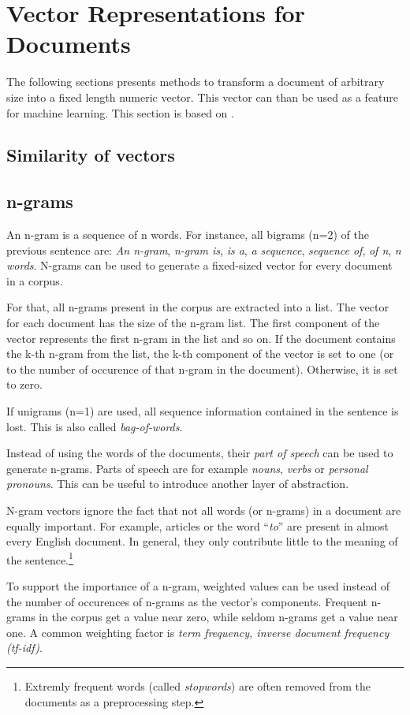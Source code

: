 \section{Vector Representations for Documents}
The following sections presents methods to transform a document of arbitrary size into a fixed length numeric vector. This vector can than be used as a feature for machine learning. This section is based on \cite{martin2009speech}.

\subsection{Similarity of vectors}

\subsection{n-grams}
An n-gram is a sequence of n words. For instance, all bigrams (n=2) of the previous sentence are: \emph{An n-gram}, \emph{n-gram is}, \emph{is a}, \emph{a sequence}, \emph{sequence of}, \emph{of n}, \emph{n words}. N-grams can be used to generate a fixed-sized vector for every document in a corpus.

For that, all n-grams present in the corpus are extracted into a list. The vector for each document has the size of the n-gram list. The first component of the vector represents the first n-gram in the list and so on. If the document contains the k-th n-gram from the list, the k-th component of the vector is set to one (or to the number of occurence of that n-gram in the document). Otherwise, it is set to zero.

If unigrams (n=1) are used, all sequence information contained in the sentence is lost. This is also called \emph{bag-of-words}.

Instead of using the words of the documents, their \emph{part of speech} can be used to generate n-grams. Parts of speech are for example \emph{nouns}, \emph{verbs} or \emph{personal pronouns}. This can be useful to introduce another layer of abstraction.

N-gram vectors ignore the fact that not all words (or n-grams) in a document are equally important. For example, articles or the word \enquote{\emph{to}} are present in almost every English document. In general, they only contribute little to the meaning of the sentence.\footnote{Extremly frequent words (called \emph{stopwords}) are often removed from the documents as a preprocessing step.}

To support the importance of a n-gram, weighted values can be used instead of the number of occurences of n-grams as the vector's components. Frequent n-grams in the corpus get a value near zero, while seldom n-grams get a value near one. A common weighting factor is \emph{term frequency, inverse document frequency (tf-idf)}.

